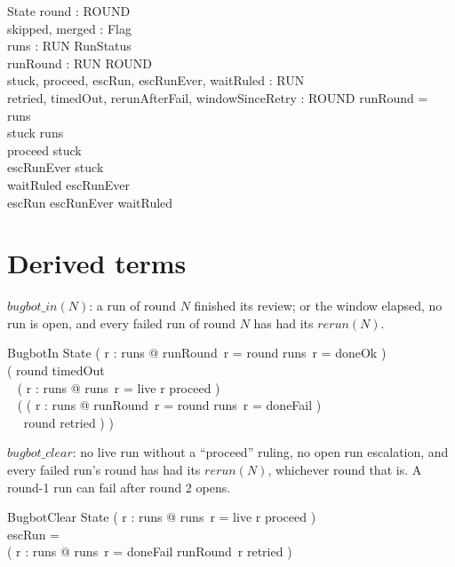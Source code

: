 \documentclass{article}
\begin{document}
\begin{schema}{State}
  round : ROUND \\
  skipped, merged : Flag \\
  runs : RUN \pfun RunStatus \\
  runRound : RUN \pfun ROUND \\
  stuck, proceed, escRun, escRunEver, waitRuled : \power RUN \\
  retried, timedOut, rerunAfterFail, windowSinceRetry : \power ROUND
\where
  \dom runRound = \dom runs \\
  stuck \subseteq \dom runs \\
  proceed \subseteq stuck \\
  escRunEver \subseteq stuck \\
  waitRuled \subseteq escRunEver \\
  escRun \subseteq escRunEver \setminus waitRuled
\end{schema}

\section{Derived terms}

$bugbot\_in(N)$: a run of round $N$ finished its review; or the window
elapsed, no run is open, and every failed run of round $N$ has had its
$rerun(N)$.

\begin{schema}{BugbotIn}
  State
\where
  ( \exists r : \dom runs @ runRound~r = round \land runs~r = doneOk ) \lor \\
  ( round \in timedOut \land \\
  \quad~ ( \forall r : \dom runs @ runs~r = live \implies r \in proceed ) \land \\
  \quad~ ( ( \exists r : \dom runs @ runRound~r = round \land runs~r = doneFail ) \\
  \quad~\quad~ \implies round \in retried ) )
\end{schema}

$bugbot\_clear$: no live run without a ``proceed'' ruling, no open run
escalation, and every failed run's round has had its $rerun(N)$, whichever
round that is. A round-1 run can fail after round 2 opens.

\begin{schema}{BugbotClear}
  State
\where
  ( \forall r : \dom runs @ runs~r = live \implies r \in proceed ) \\
  escRun = \emptyset \\
  ( \forall r : \dom runs @ runs~r = doneFail \implies runRound~r \in retried )
\end{schema}
\end{document}
